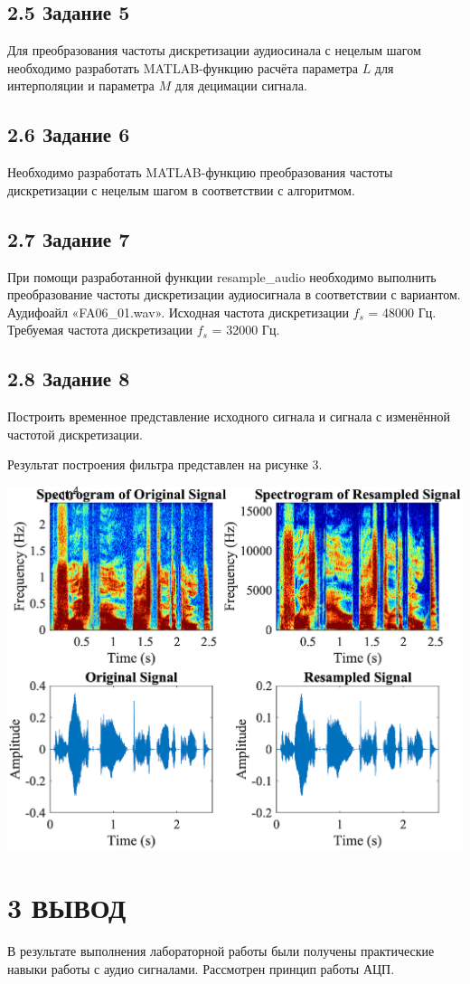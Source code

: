 \documentclass[a4paper,14pt]{extarticle}
\begin{document}
\subsection*{2.5 Задание 5}
Для преобразования частоты дискретизации аудиосинала с нецелым шагом
необходимо разработать MATLAB-функцию расчёта параметра $L$ для интерполяции и
параметра $M$ для децимации сигнала.



\subsection*{2.6 Задание 6}
Необходимо разработать MATLAB-функцию преобразования частоты дискретизации
с нецелым шагом в соответствии с алгоритмом.



\subsection*{2.7 Задание 7}
При помощи разработанной функции resample\_audio необходимо 
выполнить преобразование частоты дискретизации аудиосигнала в 
соответствии с вариантом. Аудифоайл «FA06\_01.wav».
Исходная частота дискретизации $f_s$ = 48000 Гц.
Требуемая частота дискретизации $f_s$ = 32000 Гц.



\subsection*{2.8 Задание 8}
Построить временное представление исходного сигнала и сигнала с изменённой
частотой дискретизации.



  Результат построения фильтра представлен 
на рисунке 3.
\begin{center}
  \includegraphics{img/Task_8.png}
\end{center}

\section*{3 ВЫВОД}

  В результате выполнения лабораторной работы были получены 
практические навыки работы с аудио сигналами. Рассмотрен принцип работы АЦП.
\end{document}
